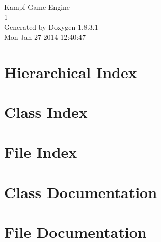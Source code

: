 \documentclass{book}
\begin{document}
\hypersetup{pageanchor=false,citecolor=blue}
\begin{titlepage}
\vspace*{7cm}
\begin{center}
{\Large Kampf Game Engine \\[1ex]\large 1 }\\
\vspace*{1cm}
{\large Generated by Doxygen 1.8.3.1}\\
\vspace*{0.5cm}
{\small Mon Jan 27 2014 12:40:47}\\
\end{center}
\end{titlepage}
\clearemptydoublepage
{}
\tableofcontents
\clearemptydoublepage
{}
\hypersetup{pageanchor=true,citecolor=blue}
\chapter{Hierarchical Index}

\chapter{Class Index}

\chapter{File Index}

\chapter{Class Documentation}
































\chapter{File Documentation}

\printindex
\end{document}
